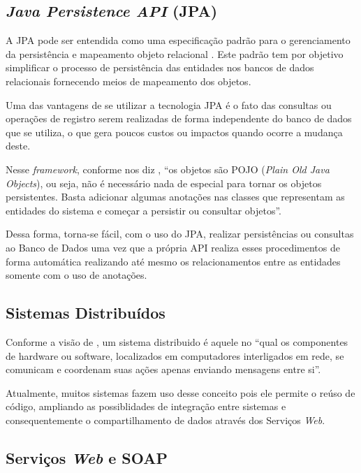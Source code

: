 \subsection{\textbf{\textit{Java Persistence API} (JPA)}}

A JPA pode ser entendida como uma especificação padrão para o gerenciamento da persistência e mapeamento objeto relacional \cite{castilho}. Este padrão tem por objetivo simplificar o processo de persistência das entidades nos bancos de dados relacionais fornecendo meios de mapeamento dos objetos.

Uma das vantagens de se utilizar a tecnologia JPA é o fato das consultas ou operações de registro serem realizadas de forma independente do banco de dados que se utiliza, o que gera poucos custos ou impactos quando ocorre a mudança deste.

Nesse \textit{framework}, conforme nos diz , ``os objetos são POJO (\textit{Plain Old Java Objects}), ou seja, não é necessário nada de especial para tornar os objetos persistentes. Basta adicionar algumas anotações nas classes que representam as entidades do sistema e começar a persistir ou consultar objetos''.

Dessa forma, torna-se fácil, com o uso do JPA, realizar persistências ou consultas ao Banco de Dados uma vez que a própria API realiza esses procedimentos de forma automática realizando até mesmo os relacionamentos entre as entidades somente com o uso de anotações.

\subsection{\textbf{Sistemas Distribuídos}}

Conforme a visão de , um sistema distribuido é aquele no ``qual os componentes de hardware ou software, localizados em computadores interligados em rede, se comunicam e coordenam suas ações apenas enviando mensagens entre si''.

Atualmente, muitos sistemas fazem uso desse conceito pois ele permite o reúso de código, ampliando as possiblidades de integração entre sistemas e consequentemente o compartilhamento de dados através dos Serviços \textit{Web}.

\subsection{Serviços \textit{Web} e SOAP}

